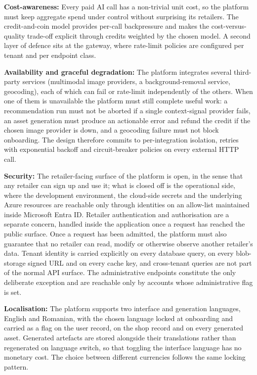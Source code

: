 \textbf{Cost-awareness:} Every paid AI call has a non-trivial unit cost, so the platform must keep aggregate spend under control without surprising its retailers. The credit-and-coin model provides per-call backpressure and makes the cost-versus-quality trade-off explicit through credits weighted by the chosen model. A second layer of defence sits at the gateway, where rate-limit policies are configured per tenant and per endpoint class.

\textbf{Availability and graceful degradation:} The platform integrates several third-party services (multimodal image providers, a background-removal service, geocoding), each of which can fail or rate-limit independently of the others. When one of them is unavailable the platform must still complete useful work: a recommendation run must not be aborted if a single context-signal provider fails, an asset generation must produce an actionable error and refund the credit if the chosen image provider is down, and a geocoding failure must not block onboarding. The design therefore commits to per-integration isolation, retries with exponential backoff and circuit-breaker policies on every external HTTP call.

\textbf{Security:} The retailer-facing surface of the platform is open, in the sense that any retailer can sign up and use it; what is closed off is the operational side, where the development environment, the cloud-side secrets and the underlying Azure resources are reachable only through identities on an allow-list maintained inside Microsoft Entra ID. Retailer authentication and authorisation are a separate concern, handled inside the application once a request has reached the public surface. Once a request has been admitted, the platform must also guarantee that no retailer can read, modify or otherwise observe another retailer's data. Tenant identity is carried explicitly on every database query, on every blob-storage signed URL and on every cache key, and cross-tenant queries are not part of the normal API surface. The administrative endpoints constitute the only deliberate exception and are reachable only by accounts whose administrative flag is set.

\textbf{Localisation:} The platform supports two interface and generation languages, English and Romanian, with the chosen language locked at onboarding and carried as a flag on the user record, on the shop record and on every generated asset. Generated artefacts are stored alongside their translations rather than regenerated on language switch, so that toggling the interface language has no monetary cost. The choice between different currencies follows the same locking pattern.

